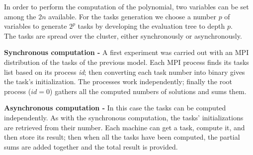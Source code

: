In order to perform the computation of the polynomial, two variables can be set among the $2n$ available. For the tasks generation we choose a number $p$ of variables to generate $2^p$ tasks by developing the evaluation tree to depth $p$.\\
 
 
The tasks are spread over the cluster, either synchronously or asynchronously.

\textbf{Synchronous computation -}
A first experiment was carried out with an MPI distribution of the tasks of the previous model. 
Each MPI process finds its tasks list based on its process \textit{id}; then converting each task number into binary gives the task's initialization. 
The processes work independently; finally the root process ($id=0$) gathers all the computed numbers of solutions and sums them.

\textbf{Asynchronous computation -}
\label{section:asynchronous}
In this case the tasks can be computed independently. 
As with the synchronous computation, the tasks' initializations are retrieved from their number. 
Each machine can get a task,  compute it, and then store its result; then when all the tasks have been computed, the partial sums are added together and the total result is provided. 



